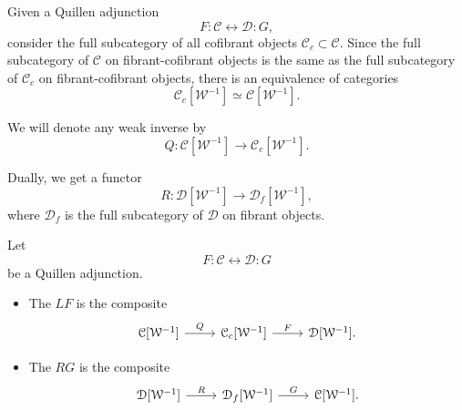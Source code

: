 \documentclass[main.tex]{subfiles}
\begin{document}
Given a Quillen adjunction
\begin{equation*}
  F : \mathcal{C} \leftrightarrow \mathcal{D} : G,
\end{equation*}
consider the full subcategory of all cofibrant objects $\mathcal{C}_{c} \subset \mathcal{C}$. Since the full subcategory of $\mathcal{C}$ on fibrant-cofibrant objects is the same as the full subcategory of $\mathcal{C}_{c}$ on fibrant-cofibrant objects, there is an equivalence of categories
\begin{equation*}
  \mathcal{C}_{c}[\mathcal{W}^{-1}] \simeq \mathcal{C}[\mathcal{W}^{-1}].
\end{equation*}

We will denote any weak inverse by
\begin{equation*}
  Q\colon \mathcal{C}[\mathcal{W}^{-1}] \to \mathcal{C}_{c}[\mathcal{W}^{-1}].
\end{equation*}

Dually, we get a functor
\begin{equation*}
  R\colon \mathcal{D}[\mathcal{W}^{-1}] \to \mathcal{D}_{f}[\mathcal{W}^{-1}],
\end{equation*}
where $\mathcal{D}_{f}$ is the full subcategory of $\mathcal{D}$ on fibrant objects.

\begin{definition}
  \label{def:left_derived_functor}
  Let
  \begin{equation*}
    F : \mathcal{C} \leftrightarrow \mathcal{D} : G
  \end{equation*}
  be a Quillen adjunction.
  \begin{itemize}
    \item The  $LF$ is the composite
      \begin{equation*}
        \begin{tikzcd}
          \mathcal{C}[\mathcal{W}^{-1}]
          \arrow[r, "Q"]
          & \mathcal{C}_{c}[\mathcal{W}^{-1}]
          \arrow[r, "F"]
          & \mathcal{D}[\mathcal{W}^{-1}].
        \end{tikzcd}
      \end{equation*}

    \item The  $RG$ is the composite
      \begin{equation*}
        \begin{tikzcd}
          \mathcal{D}[\mathcal{W}^{-1}]
          \arrow[r, "R"]
          & \mathcal{D}_{f}[\mathcal{W}^{-1}]
          \arrow[r, "G"]
          & \mathcal{C}[\mathcal{W}^{-1}].
        \end{tikzcd}
      \end{equation*}
  \end{itemize}
\end{definition}
\end{document}
